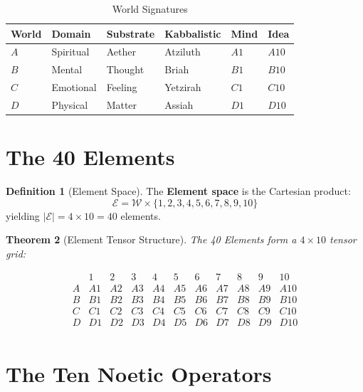 \documentclass[11pt,twoside,openright]{book}
\theoremstyle{definition}
\newtheorem{definition}{Definition}[chapter]
\theoremstyle{plain}
\newtheorem{theorem}[definition]{Theorem}
\theoremstyle{remark}
\newcommand{\Worlds}{\mathcal{W}}
\newcommand{\Elements}{\mathcal{E}}
\begin{document}
\begin{table}[h]
\centering
\caption{World Signatures}
\label{tab:world-signatures}
\begin{tabular}{llllll}
\toprule
\textbf{World} & \textbf{Domain} & \textbf{Substrate} & \textbf{Kabbalistic} & \textbf{Mind} & \textbf{Idea} \\
\midrule
$A$ & Spiritual & Aether & Atziluth & $A1$ & $A10$ \\
$B$ & Mental & Thought & Briah & $B1$ & $B10$ \\
$C$ & Emotional & Feeling & Yetzirah & $C1$ & $C10$ \\
$D$ & Physical & Matter & Assiah & $D1$ & $D10$ \\
\bottomrule
\end{tabular}
\end{table}

\section{The 40 Elements}

\begin{definition}[Element Space]
\label{def:element-space}
The \textbf{Element space} is the Cartesian product:
\[
\Elements = \Worlds \times \{1, 2, 3, 4, 5, 6, 7, 8, 9, 10\}
\]
yielding $|\Elements| = 4 \times 10 = 40$ elements.
\end{definition}

\begin{theorem}[Element Tensor Structure]
\label{thm:element-tensor}
The 40 Elements form a $4 \times 10$ tensor grid:

\[
\begin{array}{c|cccccccccc}
 & 1 & 2 & 3 & 4 & 5 & 6 & 7 & 8 & 9 & 10 \\
\hline
A & A1 & A2 & A3 & A4 & A5 & A6 & A7 & A8 & A9 & A10 \\
B & B1 & B2 & B3 & B4 & B5 & B6 & B7 & B8 & B9 & B10 \\
C & C1 & C2 & C3 & C4 & C5 & C6 & C7 & C8 & C9 & C10 \\
D & D1 & D2 & D3 & D4 & D5 & D6 & D7 & D8 & D9 & D10 \\
\end{array}
\]
\end{theorem}

\section{The Ten Noetic Operators}
\end{document}
